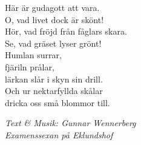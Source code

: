\vspace{10pt}
Här är gudagott att vara.\\
O, vad livet dock är skönt!\\
Hör, vad fröjd från fåglars skara.\\
Se, vad gräset lyser grönt!\\
Humlan surrar,\\
fjäriln prålar,\\
lärkan slår i skyn sin drill.\\
Och ur nektarfyllda skålar\\
dricka oss små blommor till.\par
\vspace{10pt}
  {\footnotesize\textit{Text \& Musik: Gunnar Wennerberg\\
      Examenssexan på Eklundshof}}
